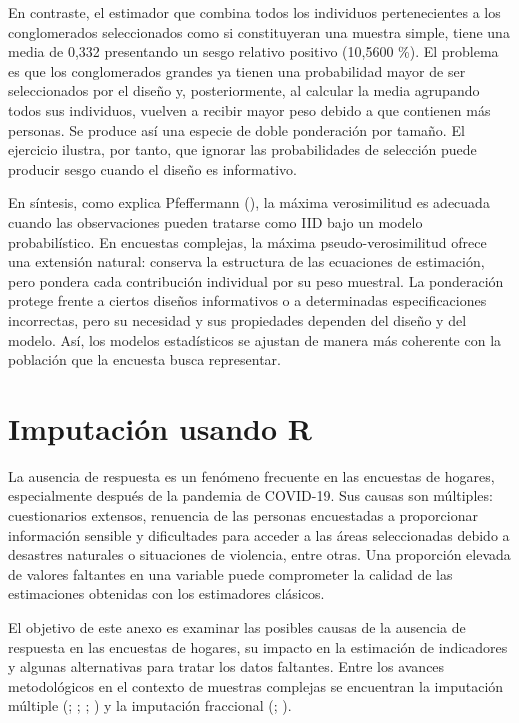 \documentclass[
  spanish,
  11pt,
  letterpaper,
  oneside,
  open=any]{scrbook}
\begin{document}
En contraste, el estimador que combina todos los individuos
pertenecientes a los conglomerados seleccionados como si constituyeran
una muestra simple, tiene una media de 0,332 presentando un sesgo
relativo positivo (10,5600 \%). El problema es que los conglomerados
grandes ya tienen una probabilidad mayor de ser seleccionados por el
diseño y, posteriormente, al calcular la media agrupando todos sus
individuos, vuelven a recibir mayor peso debido a que contienen más
personas. Se produce así una especie de doble ponderación por tamaño. El
ejercicio ilustra, por tanto, que ignorar las probabilidades de
selección puede producir sesgo cuando el diseño es informativo.

En síntesis, como explica Pfeffermann
(), la máxima verosimilitud es
adecuada cuando las observaciones pueden tratarse como IID bajo un
modelo probabilístico. En encuestas complejas, la máxima
pseudo-verosimilitud ofrece una extensión natural: conserva la
estructura de las ecuaciones de estimación, pero pondera cada
contribución individual por su peso muestral. La ponderación protege
frente a ciertos diseños informativos o a determinadas especificaciones
incorrectas, pero su necesidad y sus propiedades dependen del diseño y
del modelo. Así, los modelos estadísticos se ajustan de manera más
coherente con la población que la encuesta busca representar.

\chapter{Imputación usando R}\label{ap3}

La ausencia de respuesta es un fenómeno frecuente en las encuestas de
hogares, especialmente después de la pandemia de COVID-19. Sus causas
son múltiples: cuestionarios extensos, renuencia de las personas
encuestadas a proporcionar información sensible y dificultades para
acceder a las áreas seleccionadas debido a desastres naturales o
situaciones de violencia, entre otras. Una proporción elevada de valores
faltantes en una variable puede comprometer la calidad de las
estimaciones obtenidas con los estimadores clásicos.

El objetivo de este anexo es examinar las posibles causas de la ausencia
de respuesta en las encuestas de hogares, su impacto en la estimación de
indicadores y algunas alternativas para tratar los datos faltantes.
Entre los avances metodológicos en el contexto de muestras complejas se
encuentran la imputación múltiple
(;
;
;
) y la imputación
fraccional (;
).
\end{document}
